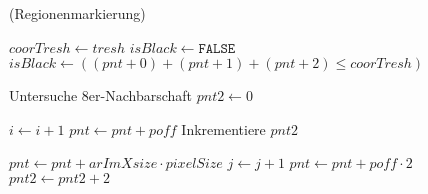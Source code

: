 \begin{algorithm}[ht]
\caption{ (Regionenmarkierung)}
\label{alg:arlabeling-regionlabeling}
\begin{algorithmic}[1]
	\label{alg:arlabeling-regionlabeling-loop1-start}

		\label{alg:arlabeling-regionlabeling-loop2-start}

			\State $\mathit{coorTresh} \gets \mathit{tresh}$
			\label{alg:arlabeling-regionlabeling-threshold-start}
			\State $\mathit{isBlack} \gets \texttt{FALSE}$
			\State $\mathit{isBlack} \gets \left( \left(\mathit{pnt} + 0\right) + \left(\mathit{pnt} + 1\right) + \left(\mathit{pnt} + 2\right) \leq \mathit{coorTresh} \right)$
			\label{alg:arlabeling-regionlabeling-calcblack}

			\label{alg:arlabeling-regionlabeling-isblack?}
				\State Untersuche 8er-Nachbarschaft
				\label{alg:arlabeling-regionlabeling-black}
			\Else
				\State $\mathit{pnt2} \gets 0$
				\label{alg:arlabeling-regionlabeling-notblack}
			\EndIf
			\label{alg:arlabeling-regionlabeling-threshold-end}

			\State $i \gets i + 1$
			\label{alg:arlabeling-regionlabeling-inc1-start}
			\State $\mathit{pnt} \gets \mathit{pnt} + \mathit{poff}$
			\State Inkrementiere $\mathit{pnt2}$
			\label{alg:arlabeling-regionlabeling-inc1-end}
		\EndFor
		\label{alg:arlabeling-regionlabeling-loop2-end}

		\State $\mathit{pnt} \gets \mathit{pnt} + \mathit{arImXsize} \cdot \mathit{pixelSize}$
		\label{alg:arlabeling-regionlabeling-inc2-start}
		\State $j \gets j + 1$
		\State $\mathit{pnt} \gets \mathit{pnt} + \mathit{poff} \cdot 2$
		\State $\mathit{pnt2} \gets \mathit{pnt2} + 2$
		\label{alg:arlabeling-regionlabeling-inc2-end}
	\EndFor
	\label{alg:arlabeling-regionlabeling-loop1-end}
\end{algorithmic}
\end{algorithm}